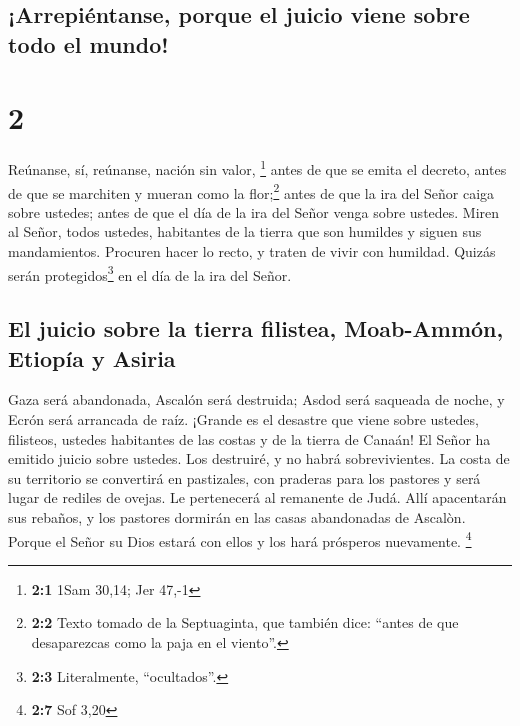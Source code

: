 \hypertarget{arrepiuxe9ntanse-porque-el-juicio-viene-sobre-todo-el-mundo}{%
\subsection{¡Arrepiéntanse, porque el juicio viene sobre todo el
mundo!}\label{arrepiuxe9ntanse-porque-el-juicio-viene-sobre-todo-el-mundo}}

\hypertarget{section-1}{%
\section{2}\label{section-1}}

 Reúnanse, sí, reúnanse, nación sin valor, \footnote{\textbf{2:1}
  1Sam 30,14; Jer 47,-1}  antes de que se emita el
decreto, antes de que se marchiten y mueran como la flor;\footnote{\textbf{2:2}
  Texto tomado de la Septuaginta, que también dice: ``antes de que
  desaparezcas como la paja en el viento''.} antes de que la ira del
Señor caiga sobre ustedes; antes de que el día de la ira del Señor venga
sobre ustedes.  Miren al Señor, todos ustedes, habitantes
de la tierra que son humildes y siguen sus mandamientos. Procuren hacer
lo recto, y traten de vivir con humildad. Quizás serán
protegidos\footnote{\textbf{2:3} Literalmente, ``ocultados''.} en el día
de la ira del Señor.

\hypertarget{el-juicio-sobre-la-tierra-filistea-moab-ammuxf3n-etiopuxeda-y-asiria}{%
\subsection{El juicio sobre la tierra filistea, Moab-Ammón, Etiopía y
Asiria}\label{el-juicio-sobre-la-tierra-filistea-moab-ammuxf3n-etiopuxeda-y-asiria}}

 Gaza será abandonada, Ascalón será destruida; Asdod será
saqueada de noche, y Ecrón será arrancada de raíz. 
¡Grande es el desastre que viene sobre ustedes, filisteos, ustedes
habitantes de las costas y de la tierra de Canaán! El Señor ha emitido
juicio sobre ustedes. Los destruiré, y no habrá sobrevivientes.
 La costa de su territorio se convertirá en pastizales,
con praderas para los pastores y será lugar de rediles de ovejas.
 Le pertenecerá al remanente de Judá. Allí apacentarán sus
rebaños, y los pastores dormirán en las casas abandonadas de Ascalòn.
Porque el Señor su Dios estará con ellos y los hará prósperos
nuevamente. \footnote{\textbf{2:7} Sof 3,20}

